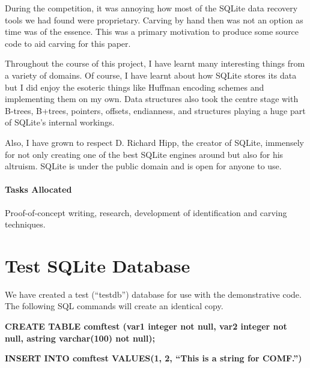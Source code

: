 \documentclass{article}
\begin{document}
During the competition, it was annoying how most of the SQLite data recovery tools we had found were proprietary. Carving by hand then was not an option as time was of the essence. This was a primary motivation to produce some source code to aid carving for this paper.

Throughout the course of this project, I have learnt many interesting things from a variety of domains. Of course, I have learnt about how SQLite stores its data but I did enjoy the esoteric things like Huffman encoding schemes and implementing them on my own. Data structures also took the centre stage with B-trees, B+trees, pointers, offsets, endianness, and structures playing a huge part of SQLite's internal workings.

Also, I have grown to respect D. Richard Hipp, the creator of SQLite, immensely for not only creating one of the best SQLite engines around but also for his altruism. SQLite is under the public domain and is open for anyone to use.

\paragraph{Tasks Allocated} Proof-of-concept writing, research, development of identification and carving techniques.

\clearpage


\newcommand{\code}[2]{
  \hrulefill
  \subsection*{#1}
  
  \vspace{2em}
}

\appendix

\section{Test SQLite Database}
We have created a test (``testdb'') database for use with the demonstrative code. The following SQL commands will create an identical copy.

\noindent\textbf{CREATE TABLE comftest (var1 integer not null, var2 integer not null, astring varchar(100) not null);}

\noindent\textbf{INSERT INTO comftest VALUES(1, 2, ``This is a string for COMF.'')}
\end{document}
